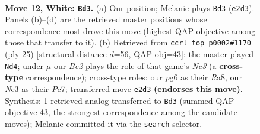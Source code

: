 \documentclass[11pt]{article}
\begin{document}
\clearpage

\begin{figure}[p]\centering
\begin{subfigure}{0.46\textwidth}\centering
\resizebox{\linewidth}{!}{%
\newchessgame
\chessboard[
  setfen={r1bq1rk1/ppp2p1p/3p2p1/4b2n/2P1P3/2N4P/PP1QBPP1/R1B2RK1 w - - 3 12},
  showmover=false,
  pgfstyle=straightmove, color=movearrow, markmove={e2-d3}
]}
\caption{}
\end{subfigure}\hfill
\begin{subfigure}{0.46\textwidth}\centering
\resizebox{\linewidth}{!}{%
\newchessgame
\chessboard[
  setfen={r1b2rk1/1ppq1pbp/p1n3p1/4p3/1P2N3/3P2P1/P3PPBP/1RBQ1RK1 b - - 3 13},
  showmover=false,
  pgfstyle=straightmove, color=movearrow, markmove={c6-d4}
]}
\caption{}
\end{subfigure}
\\[4pt]

\caption{\textbf{Move 12, White: \texttt{Bd3}.} (a) Our position; Melanie plays \texttt{Bd3} (\texttt{e2d3}). Panels (b)--(d) are the retrieved master positions whose correspondence most drove this move (highest QAP objective among those that transfer to it). (b) Retrieved from \texttt{ccrl\_top\_p0002\#1170} (ply 25) [structural distance $d$=56, QAP obj=43]: the master played \texttt{Nd4}; under $\mu$ our \emph{Be2} plays the role of that game's \emph{Nc3} (a \textbf{cross-type} correspondence); cross-type roles: our \emph{p}g6 as their \emph{R}a8, our \emph{N}c3 as their \emph{P}c7; transferred move \texttt{e2d3} \textbf{(endorses this move)}. Synthesis: 1 retrieved analog transferred to \texttt{Bd3} (summed QAP objective 43, the strongest correspondence among the candidate moves); Melanie committed it via the \texttt{search} selector.}
\label{fig:thought-m22}
\end{figure}

\clearpage
\end{document}
